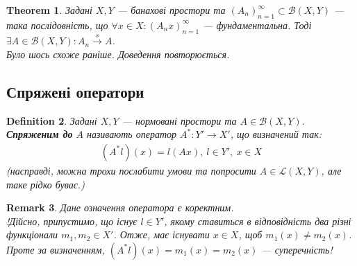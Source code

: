 \documentclass[a4paper, 10pt]{article}
\makeatletter
\def\rightproof{$\boxed{\Rightarrow}$ }
\theoremstyle{theoremdd}
\newtheorem{theorem}{Theorem}[subsection]
\theoremstyle{theoremdd}
\newtheorem{definition}[theorem]{Definition}
\theoremstyle{theoremdd}
\theoremstyle{theoremdd}
\theoremstyle{theoremdd}
\theoremstyle{theoremdd}
\newtheorem{remark}[theorem]{Remark}
\theoremstyle{theoremdd}
\theoremstyle{theoremdd}
\newcommand{\toweak}{\overset{w}{\to}}
\newcommand{\tostrong}{\overset{s}{\to}}
\renewenvironment{proof}[1][Proof.\\]{\par
\pushQED{\hfill \qed}%
\normalfont \topsep6\p@\@plus6\p@\relax
\trivlist
\item\relax
{\bfseries
#1\@addpunct{.}}\hspace\labelsep\ignorespaces
}{%
\popQED\endtrivlist\@endpefalse
}
\makeatother
\begin{document}
\begin{theorem}
Задані $X,Y$ --- банахові простори та $(A_n)_{n=1}^\infty \subset \mathcal{B}(X,Y)$ --- така послідовність, що $\forall x \in X: (A_n x)_{n=1}^\infty$ --- фундаментальна. Тоді $\exists A \in \mathcal{B}(X,Y): A_n \tostrong A$.\\
\textit{Було шось схоже раніше. Доведення повторюється.}
\end{theorem}

\iffalse
\begin{theorem}
Розглянемо простір $C([0,1])$.\\
$f_n \toweak f \iff \begin{cases} \forall t \in [0,1]: f_n(t) \to f(t) \\ \|f_n\| \leq M,\ M > 0 \end{cases}$.
\end{theorem}

\begin{proof}
\rightproof Дано: $f_n \toweak f$. Розглянемо будь-яку точку $t_0 \in [0,1]$, а згодом оберемо функцію $g(t) = \begin{cases} 0, & x \leq t_0 \\ 1, & x > t_0 \end{cases}$. Тоді зауважимо, що $\displaystyle\int_0^1 f_n(t) - f(t)\,dg(t) = f_n(t) - f(t_0)$ (обчислення інтеграла Стілтьєса). Такому інтегралу відповідає функціонал $l \in (C([0,1]))'$. За умовою, $l(f_n) \to l(f)$, тобто $|l(f_n) - l(f)| = \displaystyle\left| \int_0^1 f_n(t) - f(t)\,dg(t)  \right| = |f_n(t_0) - f(t_0)| \to 0 \implies f_n(t_0) \to f(t_0)$.ґґ
Оскільки $($
\end{proof}
\fi

\subsection{Спряжені оператори}
\begin{definition}
Задані $X,Y$ --- нормовані простори та $A \in \mathcal{B}(X,Y)$.\\
\textbf{Спряженим до} $A$ називають оператор $A^* \colon Y' \to X'$, що визначений так:
\begin{align*}
(A^*l)(x) = l(Ax),\ l \in Y',\ x \in X
\end{align*}
(насправді, можна трохи послабити умови та попросити $A \in \mathcal{L}(X,Y)$, але таке рідко буває.)
\end{definition}

\begin{remark}
Дане означення оператора є коректним.\\
!Дійсно, припустимо, що існує $l \in Y'$, якому ставиться в відповідність два різні функціонали $m_1,m_2 \in X'$. Отже, має існувати $x \in X$, щоб $m_1(x) \neq m_2(x)$. Проте за визначенням, $(A^*l)(x) = m_1(x) = m_2(x)$ --- суперечність!
\end{remark}
\end{document}
